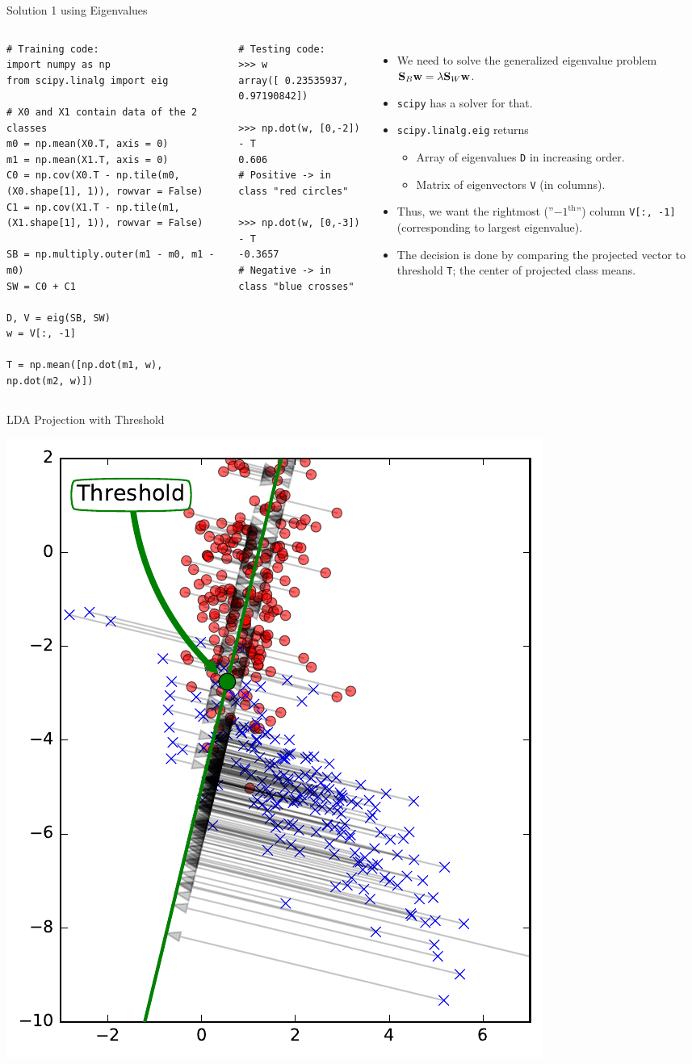 \documentclass[10pt, aspectratio=169]{beamer} %
\newcommand{\w}{{\bf w}}
\newcommand{\SB}{{\bf S}}
\begin{document}
\begin{frame}[fragile,allowframebreaks=0.8]
 {Solution 1 using Eigenvalues}
\begin{columns}[onlytextwidth]
\begin{lstlisting}
# Training code:
import numpy as np
from scipy.linalg import eig

# X0 and X1 contain data of the 2 classes
m0 = np.mean(X0.T, axis = 0)
m1 = np.mean(X1.T, axis = 0)
C0 = np.cov(X0.T - np.tile(m0, (X0.shape[1], 1)), rowvar = False)
C1 = np.cov(X1.T - np.tile(m1, (X1.shape[1], 1)), rowvar = False)

SB = np.multiply.outer(m1 - m0, m1 - m0)
SW = C0 + C1

D, V = eig(SB, SW)
w = V[:, -1]

T = np.mean([np.dot(m1, w), np.dot(m2, w)])
\end{lstlisting}
\begin{lstlisting}
# Testing code:
>>> w
array([ 0.23535937,  0.97190842])

>>> np.dot(w, [0,-2]) - T
0.606
# Positive -> in class "red circles"

>>> np.dot(w, [0,-3]) - T
-0.3657
# Negative -> in class "blue crosses"
\end{lstlisting}
\begin{itemize}
\item We need to solve the generalized eigenvalue problem
$\SB_B\w = \lambda \SB_W\w$.
\item \verb+scipy+ has a solver for that.
\item \verb+scipy.linalg.eig+ returns
\begin{itemize}
\item Array of eigenvalues \verb+D+ in increasing order.
\item Matrix of eigenvectors \verb+V+ (in columns).
\end{itemize}
\item Thus, we want the rightmost (''$-1^{\text{th}}$'') column \verb+V[:, -1]+ (corresponding to largest eigenvalue).
\item The decision is done by comparing the projected vector to threshold \verb+T+; the center of projected class means.
\end{itemize}
\end{columns}
\end{frame}

\begin{frame}{LDA Projection with Threshold}
\centerline{\includegraphics[width=0.4\columnwidth]{LDA_proj1_threshold.pdf}}
\end{frame}
\end{document}
